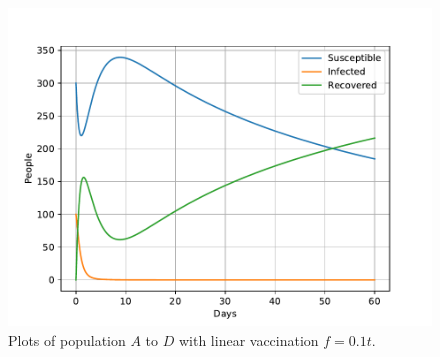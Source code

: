 \documentclass[a4paper]{article}
\begin{document}
\begin{figure}[!htb]
	\includegraphics[scale=0.56]{../plots/opp_e_D2.pdf}
	\caption{Plots of population $A$ to $D$ with linear vaccination $f=0.1 t$.}
	\label{opp_e1}
\end{figure}
\end{document}
